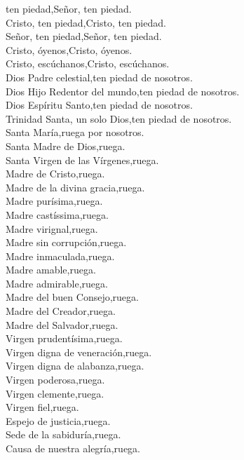 ten piedad,\hfill Señor, ten piedad.\\
Cristo, ten piedad,\hfill Cristo, ten piedad.\\
Señor, ten piedad,\hfill Señor, ten piedad.\\
Cristo, óyenos,\hfill Cristo, óyenos.\\
Cristo, escúchanos,\hfill Cristo, escúchanos.\\
Dios Padre celestial,\hfill ten piedad de nosotros.\\
Dios Hijo Redentor del mundo,\hfill ten piedad de nosotros.\\
Dios Espíritu Santo,\hfill ten piedad de nosotros.\\
Trinidad Santa, un solo Dios,\hfill ten piedad de nosotros.\\
Santa María,\hfill ruega por nosotros.\\
Santa Madre de Dios,\hfill ruega.\\
Santa Virgen de las Vírgenes,\hfill ruega.\\
Madre de Cristo,\hfill ruega.\\
Madre de la divina gracia,\hfill ruega.\\
Madre purísima,\hfill ruega.\\
Madre castíssima,\hfill ruega.\\
Madre virignal,\hfill ruega.\\
Madre sin corrupción,\hfill ruega.\\
Madre inmaculada,\hfill ruega.\\
Madre amable,\hfill ruega.\\
Madre admirable,\hfill ruega.\\
Madre del buen Consejo,\hfill ruega.\\
Madre del Creador,\hfill ruega.\\
Madre del Salvador,\hfill ruega.\\
Virgen prudentísima,\hfill ruega.\\
Virgen digna de veneración,\hfill ruega.\\
Virgen digna de alabanza,\hfill ruega.\\
Virgen poderosa,\hfill ruega.\\
Virgen clemente,\hfill ruega.\\
Virgen fiel,\hfill ruega.\\
Espejo de justicia,\hfill ruega.\\
Sede de la sabiduría,\hfill ruega.\\
Causa de nuestra alegría,\hfill ruega.\\
